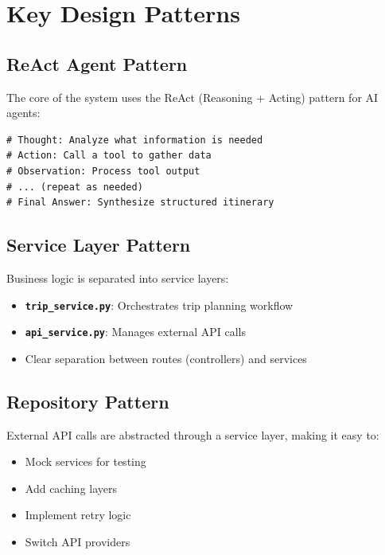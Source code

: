 \documentclass[12pt,a4paper]{report}
\newcommand{\file}[1]{\texttt{\textbf{#1}}}
\begin{document}
\section{Key Design Patterns}

\subsection{ReAct Agent Pattern}

The core of the system uses the ReAct (Reasoning + Acting) pattern for AI agents:

\begin{lstlisting}[style=pythonstyle, caption={ReAct Pattern Flow}]
# Thought: Analyze what information is needed
# Action: Call a tool to gather data
# Observation: Process tool output
# ... (repeat as needed)
# Final Answer: Synthesize structured itinerary
\end{lstlisting}

\subsection{Service Layer Pattern}

Business logic is separated into service layers:
\begin{itemize}
    \item \file{trip\_service.py}: Orchestrates trip planning workflow
    \item \file{api\_service.py}: Manages external API calls
    \item Clear separation between routes (controllers) and services
\end{itemize}

\subsection{Repository Pattern}

External API calls are abstracted through a service layer, making it easy to:
\begin{itemize}
    \item Mock services for testing
    \item Add caching layers
    \item Implement retry logic  
    \item Switch API providers
\end{itemize}

\end{document}
